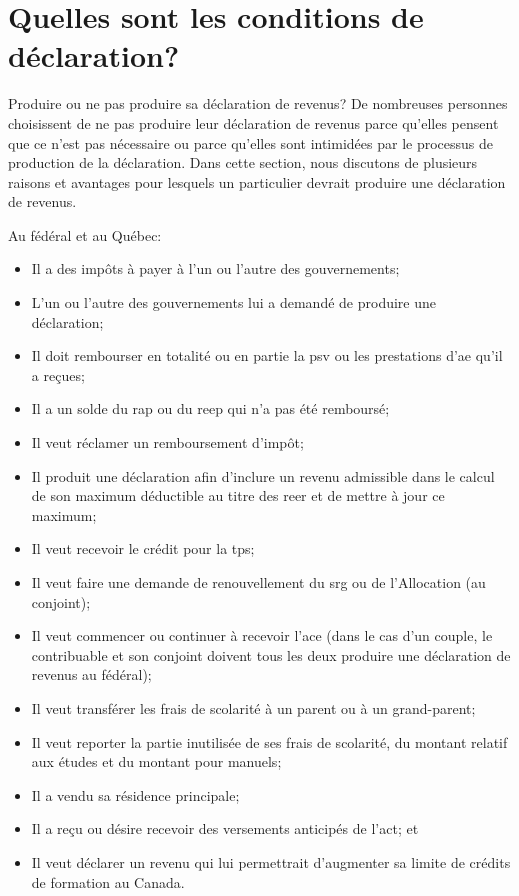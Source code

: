 \section{Quelles sont les conditions de déclaration?}
\begin{intro}
	Produire ou ne pas produire sa déclaration de revenus? De nombreuses personnes choisissent de ne pas produire leur déclaration de revenus parce qu'elles pensent que ce n'est pas nécessaire ou parce qu'elles sont intimidées par le processus de production de la déclaration. Dans cette section, nous discutons de plusieurs raisons et avantages pour lesquels un particulier devrait produire une déclaration de revenus.
\end{intro}
Au fédéral et au Québec:
\caqc
\begin{itemize}
	\item Il a des impôts à payer à l'un ou l'autre des gouvernements;
	\item L'un ou l'autre des gouvernements lui a demandé de produire une déclaration;
	\item Il doit rembourser en totalité ou en partie la \acrfull{psv} ou les prestations d'\acrfull{ae} qu'il a reçues;
	\item Il a un solde du \acrfull{rap} ou du \acrfull{reep} qui n'a pas été remboursé;
	\item Il veut réclamer un remboursement d'impôt;
	\item Il produit une déclaration afin d'inclure un revenu admissible dans le calcul de son maximum déductible au titre des \acrshort{reer} et de mettre à jour ce maximum;
	\item Il veut recevoir le crédit pour la \acrshort{tps};
	\item Il veut faire une demande de renouvellement du \acrfull{srg} ou de l'Allocation (au conjoint);
	\item Il veut commencer ou continuer à recevoir l'\acrfull{ace} (dans le cas d'un couple, le contribuable et son conjoint doivent tous les deux produire une déclaration de revenus au fédéral);
	\item Il veut transférer les frais de scolarité à un parent ou à un grand-parent;
	\item Il veut reporter la partie inutilisée de ses frais de scolarité, du montant relatif aux études et du montant pour manuels;
	\item Il a vendu sa résidence principale;
	\item Il a reçu ou désire recevoir des versements anticipés de l'\acrfull{act}; et
	\item Il veut déclarer un revenu qui lui permettrait d'augmenter sa limite de crédits de formation au Canada.
\end{itemize}

